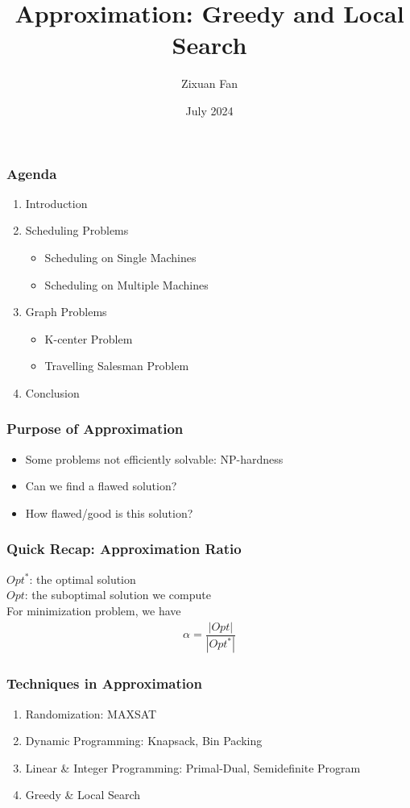 \documentclass{beamer}
\title{Approximation: Greedy and Local Search}
\author{Zixuan Fan}
\institute{Technische Universität München}
\date{July 2024}
\begin{document}
\begin{frame}
    \titlepage   
\end{frame}

\begin{frame}
    \frametitle{Agenda}
    \begin{enumerate}
        \item Introduction
        \item Scheduling Problems
            \begin{itemize}
                \item Scheduling on Single Machines
                \item Scheduling on Multiple Machines 
            \end{itemize}
        \item Graph Problems 
            \begin{itemize}
                \item K-center Problem 
                \item Travelling Salesman Problem
            \end{itemize}
        \item Conclusion
    \end{enumerate}
\end{frame}

\begin{frame}
    \frametitle{Purpose of Approximation}
    \begin{itemize}
        \item<1-> Some problems not efficiently solvable: NP-hardness
        \item<2-> Can we find a flawed solution?
        \item<3-> How flawed/good is this solution?
    \end{itemize}
\end{frame}

\begin{frame}
    \frametitle{Quick Recap: Approximation Ratio}
    $Opt^*$: the optimal solution \\ 
    $Opt$: the suboptimal solution we compute \\[10pt]
    For minimization problem, we have
    \begin{align*}
        \alpha = \dfrac{|Opt|}{|Opt^*|}
    \end{align*}
\end{frame}

\begin{frame}
    \frametitle{Techniques in Approximation}
    \begin{enumerate}
        \item<1-> Randomization: MAXSAT
        \item<2-> Dynamic Programming: Knapsack, Bin Packing
        \item<3-> Linear \& Integer Programming: Primal-Dual, Semidefinite Program 
        \item<4-> \color{red} Greedy \& Local Search \color{black}
    \end{enumerate}
\end{frame}
\end{document}
